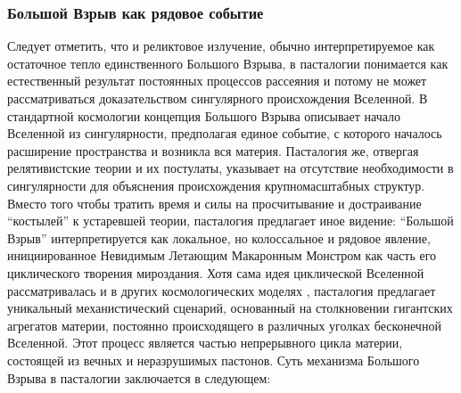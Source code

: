 \documentclass[pdflatex,sn-mathphys-num]{sn-jnl}
\begin{document}
\subsubsection{Большой Взрыв как рядовое событие}\label{subsubsec:big-bang}

Следует отметить, что и реликтовое излучение, обычно интерпретируемое как остаточное тепло единственного Большого Взрыва, в пасталогии понимается как естественный результат постоянных процессов рассеяния и потому не может рассматриваться доказательством сингулярного происхождения Вселенной.
В стандартной космологии концепция Большого Взрыва описывает начало Вселенной из сингулярности, предполагая единое событие, с которого началось расширение пространства и возникла вся материя. Пасталогия же, отвергая релятивистские теории и их постулаты, указывает на отсутствие необходимости в сингулярности для объяснения происхождения крупномасштабных структур. Вместо того чтобы тратить время и силы на просчитывание и достраивание ``костылей'' к устаревшей теории, пасталогия предлагает иное видение: ``Большой Взрыв'' интерпретируется как локальное, но колоссальное и рядовое явление, инициированное Невидимым Летающим Макаронным Монстром как часть его циклического творения мироздания. Хотя сама идея циклической Вселенной рассматривалась и в других космологических моделях \cite{steinhardt2007-cyclic}, пасталогия предлагает уникальный механистический сценарий, основанный на столкновении гигантских агрегатов материи, постоянно происходящего в различных уголках бесконечной Вселенной.
Этот процесс является частью непрерывного цикла материи, состоящей из вечных и неразрушимых пастонов. Суть механизма Большого Взрыва в пасталогии заключается в следующем:
\end{document}
